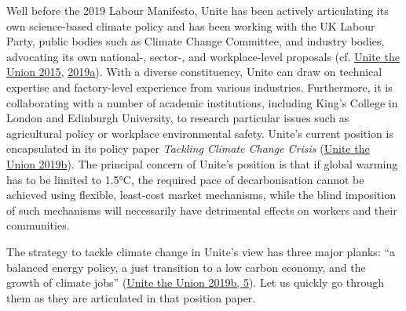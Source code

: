 \documentclass[a4paper, nobind]{templates/ociamthesis}
\begin{document}
Well before the 2019 Labour Manifesto, Unite has been actively articulating its own science-based climate policy and has been working with the UK Labour Party, public bodies such as Climate Change Committee, and industry bodies, advocating its own national-, sector-, and workplace-level proposals (cf. \protect\hyperlink{ref-unite_the_union_hope_2015}{Unite the Union 2015}, \protect\hyperlink{ref-unite_the_union_response_2019}{2019a}). With a diverse constituency, Unite can draw on technical expertise and factory-level experience from various industries. Furthermore, it is collaborating with a number of academic institutions, including King's College in London and Edinburgh University, to research particular issues such as agricultural policy or workplace environmental safety. Unite's current position is encapsulated in its policy paper \emph{Tackling Climate Change Crisis} (\protect\hyperlink{ref-unite_the_union_tackling_2019}{Unite the Union 2019b}). The principal concern of Unite's position is that if global warming has to be limited to 1.5°C, the required pace of decarbonisation cannot be achieved using flexible, least-cost market mechanisms, while the blind imposition of such mechanisms will necessarily have detrimental effects on workers and their communities.

The strategy to tackle climate change in Unite's view has three major planks: ``a balanced energy policy, a just transition to a low carbon economy, and the growth of climate jobs'' (\protect\hyperlink{ref-unite_the_union_tackling_2019}{Unite the Union 2019b, 5}). Let us quickly go through them as they are articulated in that position paper.
\end{document}
